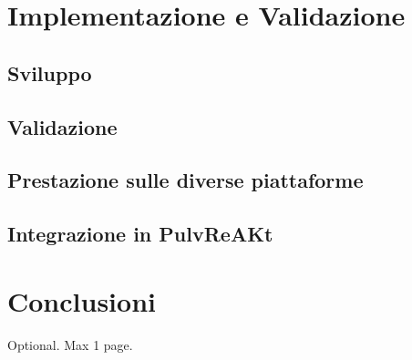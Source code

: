 \documentclass[12pt,a4paper,openright,twoside]{book}
\begin{document}
\chapter{Implementazione e Validazione}\label{chap:Implementazione e Validazione}

\section{Sviluppo}

\section{Validazione}

\section{Prestazione sulle diverse piattaforme}

\section{Integrazione in PulvReAKt}

\chapter{Conclusioni}\label{chap:Conclusioni}


\backmatter

\nocite{*} %




\begin{acknowledgements} %
Optional. Max 1 page.
\end{acknowledgements}
\end{document}
